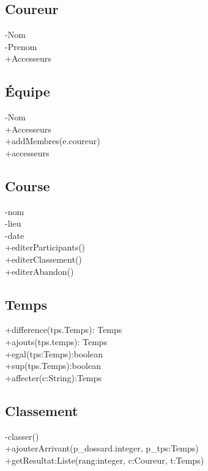 \documentclass{article}
\begin{document}
	\maketitle
	\section{}
	\section{}
	
	\section{}
	\subsection{Coureur}
		-Nom\\
		-Prenom\\
		+Accesseurs\\
	\subsection{Équipe}
		-Nom\\
		+Accesseurs\\
		+addMembres(e.coureur)\\
		+accesseurs\\
	\subsection{Course}
		-nom\\
		-lieu\\
		-date\\
		+editerParticipants()\\
		+editerClassement()\\
		+editerAbandon()\\
	\subsection{Temps}
	+difference(tps.Temps): Temps\\
	+ajouts(tps.temps): Temps\\
	+egal(tps:Temps):boolean\\
	+sup(tps.Temps):boolean\\
	+affecter(c:String):Temps

	\subsection{Classement}
	-classer()\\
	+ajouterArrivant(p\_dossard.integer, p\_tps:Temps)\\
	+getResultat:Liste(rang:integer, c:Coureur, t:Temps)\\
	
\end{document}
